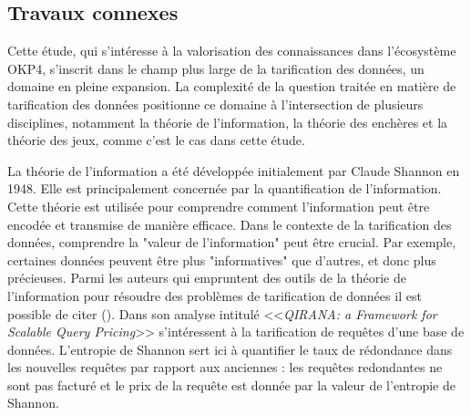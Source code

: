 



\subsection{Travaux connexes}\label{subsec:travaux_connexes}

Cette étude, qui s'intéresse à la valorisation des connaissances dans l'écosystème OKP4, s'inscrit dans le champ plus large de la tarification des données, un domaine en pleine expansion. La complexité de la question traitée en matière de tarification des données positionne ce domaine à l'intersection de plusieurs disciplines, notamment la théorie de l'information, la théorie des enchères et la théorie des jeux, comme c'est le cas dans cette étude.

La théorie de l'information a été développée initialement par Claude Shannon en 1948. Elle est principalement concernée par la quantification de l'information. Cette théorie est utilisée pour comprendre comment l'information peut être encodée et transmise de manière efficace. Dans le contexte de la tarification des données, comprendre la "valeur de l'information" peut être crucial. Par exemple, certaines données peuvent être plus "informatives" que d'autres, et donc plus précieuses. Parmi les auteurs qui empruntent des outils de la théorie de l'information pour résoudre des problèmes de tarification de données il est possible de citer \citeauthor{deep_qirana_2017} (\citeyear{deep_qirana_2017}). Dans son analyse intitulé <<\textit{QIRANA: a Framework for Scalable Query Pricing}>> \citeauthor{deep_qirana_2017} s'intéressent à la tarification de requêtes d'une base de données. L'entropie de Shannon sert ici à quantifier le taux de rédondance dans les nouvelles requêtes par rapport aux anciennes : les requêtes redondantes ne sont pas facturé et le prix de la requête est donnée par la valeur de l'entropie de Shannon.

